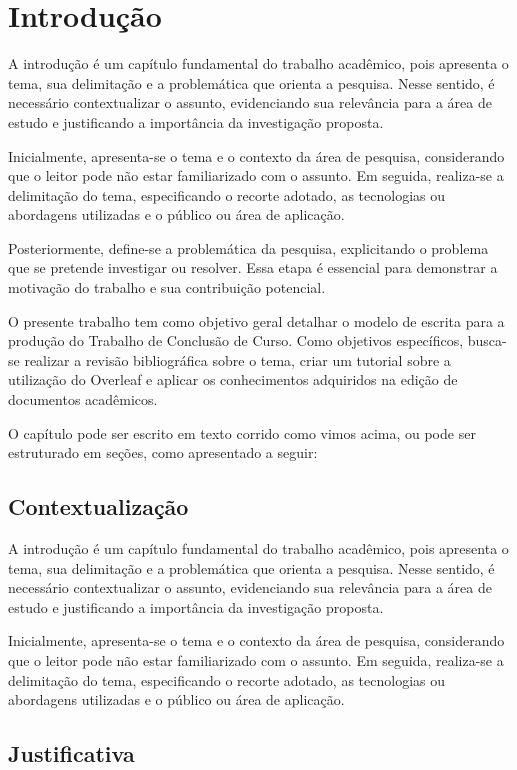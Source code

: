 \chapter{Introdução}

A introdução é um capítulo fundamental do trabalho acadêmico, pois apresenta o tema, sua delimitação e a problemática que orienta a pesquisa. Nesse sentido, é necessário contextualizar o assunto, evidenciando sua relevância para a área de estudo e justificando a importância da investigação proposta.

Inicialmente, apresenta-se o tema e o contexto da área de pesquisa, considerando que o leitor pode não estar familiarizado com o assunto. Em seguida, realiza-se a delimitação do tema, especificando o recorte adotado, as tecnologias ou abordagens utilizadas e o público ou área de aplicação.

Posteriormente, define-se a problemática da pesquisa, explicitando o problema que se pretende investigar ou resolver. Essa etapa é essencial para demonstrar a motivação do trabalho e sua contribuição potencial.

O presente trabalho tem como objetivo geral detalhar o modelo de escrita para a produção do Trabalho de Conclusão de Curso. Como objetivos específicos, busca-se realizar a revisão bibliográfica sobre o tema, criar um tutorial sobre a utilização do Overleaf e aplicar os conhecimentos adquiridos na edição de documentos acadêmicos.

O capítulo pode ser escrito em texto corrido como vimos acima, ou pode ser estruturado em seções, como apresentado a seguir:

\section{Contextualização}

A introdução é um capítulo fundamental do trabalho acadêmico, pois apresenta o tema, sua delimitação e a problemática que orienta a pesquisa. Nesse sentido, é necessário contextualizar o assunto, evidenciando sua relevância para a área de estudo e justificando a importância da investigação proposta.

Inicialmente, apresenta-se o tema e o contexto da área de pesquisa, considerando que o leitor pode não estar familiarizado com o assunto. Em seguida, realiza-se a delimitação do tema, especificando o recorte adotado, as tecnologias ou abordagens utilizadas e o público ou área de aplicação.

\section{Justificativa}


